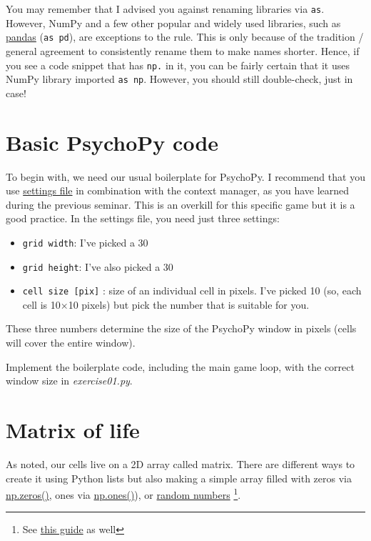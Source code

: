 \documentclass[
]{book}
\providecommand{\tightlist}{%
  \setlength{\itemsep}{0pt}\setlength{\parskip}{0pt}}
\begin{document}
You may remember that I advised you against renaming libraries via \texttt{as}. However, NumPy and a few other popular and widely used libraries, such as \href{https://pandas.pydata.org/}{pandas} (\texttt{as\ pd}), are exceptions to the rule. This is only because of the tradition / general agreement to consistently rename them to make names shorter. Hence, if you see a code snippet that has \texttt{np.} in it, you can be fairly certain that it uses NumPy library imported \texttt{as\ np}. However, you should still double-check, just in case!

\hypertarget{basic-psychopy-code}{%
\section{Basic PsychoPy code}\label{basic-psychopy-code}}

To begin with, we need our usual boilerplate for PsychoPy. I recommend that you use \protect\hyperlink{settings-files}{settings file} in combination with the context manager, as you have learned during the previous seminar. This is an overkill for this specific game but it is a good practice. In the settings file, you need just three settings:

\begin{itemize}
\tightlist
\item
  \texttt{grid\ width}: I've picked a 30
\item
  \texttt{grid\ height}: I've also picked a 30
\item
  \texttt{cell\ size\ {[}pix{]}} : size of an individual cell in pixels. I've picked 10 (so, each cell is 10×10 pixels) but pick the number that is suitable for you.
\end{itemize}

These three numbers determine the size of the PsychoPy window in pixels (cells will cover the entire window).

Implement the boilerplate code, including the main game loop, with the correct window size in \emph{exercise01.py}.

\hypertarget{matrix-of-life}{%
\section{Matrix of life}\label{matrix-of-life}}

As noted, our cells live on a 2D array called matrix. There are different ways to create it using Python lists but also making a simple array filled with zeros via \href{https://numpy.org/doc/stable/reference/generated/numpy.zeros.html}{np.zeros()}, ones via \href{https://numpy.org/doc/stable/reference/generated/numpy.ones.html}{np.ones()}), or \href{https://numpy.org/doc/stable/reference/random/index.html}{random numbers} \footnote{See \href{https://numpy.org/doc/stable/user/absolute_beginners.html\#how-to-create-a-basic-array}{this guide} as well}.
\end{document}
